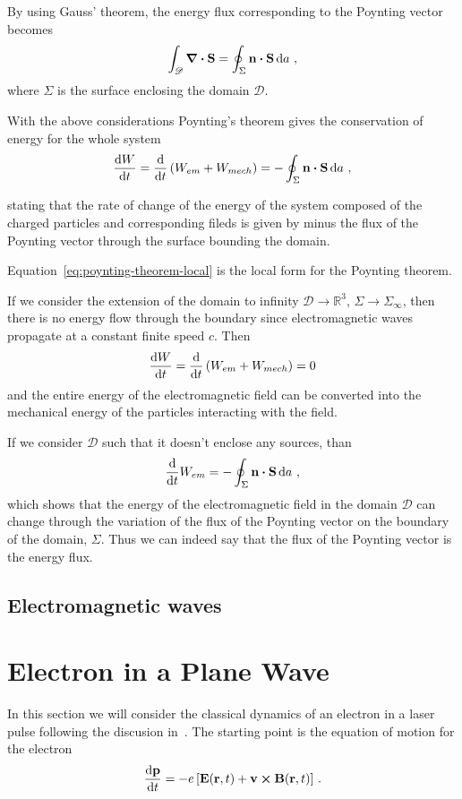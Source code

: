 \documentclass[class=report, crop=false]{standalone}
\begin{document}
By using Gauss' theorem, the energy flux corresponding to the
Poynting vector becomes
\[
  \int_{\mathscr{D}} \div{\vb{S}} = \oint_\Sigma \vb{n} \vdot \vb{S} \dd{a}\,,
\]
where \(\Sigma\) is the surface enclosing the domain \(\mathscr{D}\).

With the above considerations Poynting's theorem gives the conservation of energy for the whole system
\begin{equation}
  \label{eq:poynting-theorem}
  \dv{W}{t} = \dv{t} \left( W_{em} + W_{mech} \right) =
  -\oint_\Sigma \vb{n} \vdot \vb{S} \dd{a}\,,
\end{equation}

stating that the rate of change of the energy of the system composed of the charged
particles and corresponding fileds is given by minus the flux of the
Poynting vector through the surface bounding the domain.

Equation~\eqref{eq:poynting-theorem-local} is the local form for the Poynting
theorem.

If we consider the extension of the domain to infinity \(\mathscr{D} \to \mathbb{R}^3\),
\(\Sigma \to \Sigma_\infty\), then there is no energy flow through the
boundary since electromagnetic waves propagate at a constant finite speed \(c\). Then
\[
  \dv{W}{t} = \dv{t} \left( W_{em} + W_{mech} \right) = 0
\]
and the entire energy of the electromagnetic field can be converted into
the mechanical energy of the particles interacting with the field.

If we consider \(\mathscr{D}\) such that it doesn't enclose any sources, than
\[
  \dv{t} W_{em} = -\oint_\Sigma \vb{n} \vdot \vb{S} \dd{a}\,,
\]
which shows that the energy of the electromagnetic field in the domain
\(\mathscr{D}\) can change through the variation of the flux of the
Poynting vector on the boundary of the domain, \(\Sigma\). Thus we can
indeed say that the flux of the Poynting vector is the energy flux.

\subsection{Electromagnetic waves}


\section{Electron in a Plane Wave}

In this section we will consider the classical dynamics of an electron in a
laser pulse following the discusion in~\textcite{karsch_applicationshigh_2018}.
The starting point is the equation of motion for the electron
\begin{equation}
  \label{eq:lorentz-eom}
  \dv{\vb{p}}{t} = -e \left[ \vb{E}(\vb{r}, t) + \vb{v} \cp \vb{B}(\vb{r}, t) \right]\,.
\end{equation}
\end{document}
